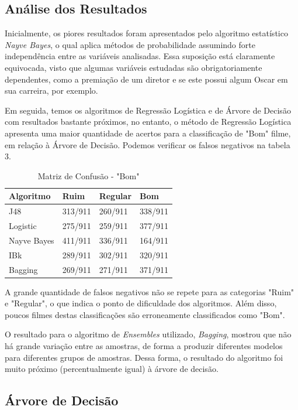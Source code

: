 \documentclass[twoside]{article}
\begin{document}
\begin{multicols}{2}
\subsection{Análise dos Resultados}

Inicialmente, os piores resultados foram apresentados pelo algoritmo estatístico \textit{Nayve Bayes}, o qual aplica métodos de probabilidade assumindo forte independência entre as variáveis analisadas. Essa suposição está claramente equivocada, visto que algumas variáveis estudadas são obrigatoriamente dependentes, como a premiação de um diretor e se este possui algum Oscar em sua carreira, por exemplo.

Em seguida, temos os algoritmos de Regressão Logística e de Árvore de Decisão com resultados bastante próximos, no entanto, o método de Regressão Logística apresenta uma maior quantidade de acertos para a classificação de "Bom" filme, em relação à Árvore de Decisão. Podemos verificar os falsos negativos na tabela 3.

\begin{table}[H]
\caption{Matriz de Confusão - "Bom"}
\centering
\begin{tabular}{l|lll}
Algoritmo & Ruim & Regular & Bom\\
\midrule
J48 & 313/911 & 260/911 & 338/911\\
Logistic & 275/911 & 259/911 & 377/911\\
Nayve Bayes & 411/911 & 336/911 & 164/911\\
IBk & 289/911 & 302/911 & 320/911\\
Bagging & 269/911 & 271/911 & 371/911\\
\bottomrule
\end{tabular}
\end{table}

A grande quantidade de falsos negativos não se repete para as categorias "Ruim" e "Regular", o que indica o ponto de dificuldade dos algoritmos. Além disso, poucos filmes destas classificações são erroneamente classificados como "Bom".

O resultado para o algoritmo de \textit{Ensembles} utilizado, \textit{Bagging}, mostrou que não há grande variação entre as amostras, de forma a produzir diferentes modelos para diferentes grupos de amostras. Dessa forma, o resultado do algoritmo foi muito próximo (percentualmente igual) à árvore de decisão. 

\subsection{Árvore de Decisão}


\end{multicols}
\end{document}
